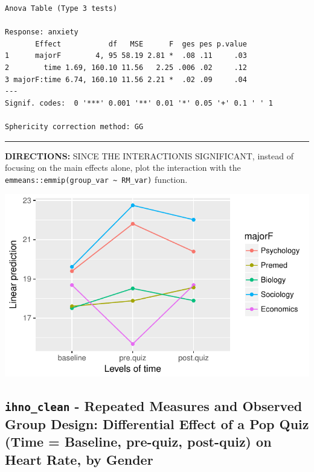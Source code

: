 \documentclass[]{article}
\newenvironment{Shaded}{\begin{snugshade}}{\end{snugshade}}
\newcommand{\KeywordTok}[1]{\textcolor[rgb]{0.13,0.29,0.53}{\textbf{#1}}}
\newcommand{\StringTok}[1]{\textcolor[rgb]{0.31,0.60,0.02}{#1}}
\newcommand{\CommentTok}[1]{\textcolor[rgb]{0.56,0.35,0.01}{\textit{#1}}}
\newcommand{\OperatorTok}[1]{\textcolor[rgb]{0.81,0.36,0.00}{\textbf{#1}}}
\newcommand{\NormalTok}[1]{#1}
\begin{document}
\begin{verbatim}
Anova Table (Type 3 tests)

Response: anxiety
       Effect           df   MSE      F  ges pes p.value
1      majorF        4, 95 58.19 2.81 *  .08 .11     .03
2        time 1.69, 160.10 11.56   2.25 .006 .02     .12
3 majorF:time 6.74, 160.10 11.56 2.21 *  .02 .09     .04
---
Signif. codes:  0 '***' 0.001 '**' 0.01 '*' 0.05 '+' 0.1 ' ' 1

Sphericity correction method: GG 
\end{verbatim}

\begin{center}\rule{0.5\linewidth}{\linethickness}\end{center}

\textbf{DIRECTIONS:} SINCE THE INTERACTIONIS SIGNIFICANT, instead of
focusing on the main effects alone, plot the interaction with the
\texttt{emmeans::emmip(group\_var\ \textasciitilde{}\ RM\_var)}
function.

\begin{Shaded}
\end{Shaded}

\begin{center}\includegraphics{Unit_5_assignment_KEY_R__spr18__files/figure-latex/unnamed-chunk-80-1} \end{center}

\clearpage

\subsection{\texorpdfstring{\texttt{ihno\_clean} - Repeated Measures and
Observed Group Design: Differential Effect of a Pop Quiz (Time =
Baseline, pre-quiz, post-quiz) on Heart Rate, by
Gender}{ihno\_clean - Repeated Measures and Observed Group Design: Differential Effect of a Pop Quiz (Time = Baseline, pre-quiz, post-quiz) on Heart Rate, by Gender}}\label{ihno_clean---repeated-measures-and-observed-group-design-differential-effect-of-a-pop-quiz-time-baseline-pre-quiz-post-quiz-on-heart-rate-by-gender}
\end{document}
